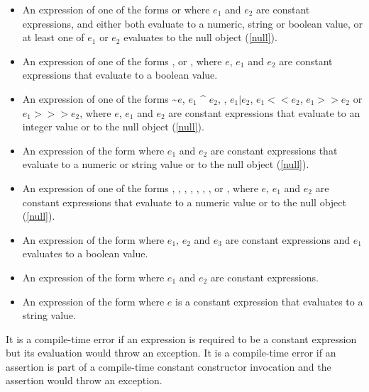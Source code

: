 \documentclass{article}
\begin{document}
\begin{itemize}
\item An expression of one of the forms  or  where $e_1$ and $e_2$ are constant expressions, and either both evaluate to a numeric, string or boolean value, or at least one of $e_1$ or $e_2$ evaluates to the null object (\ref{null}).
\item An expression of one of the forms ,  or , where $e$, $e_1$ and $e_2$ are constant expressions that evaluate to a boolean value.
\item An expression of one of the forms \~{}$e$, $e_1$ \^{} $e_2$, , $e_1 | e_2$, $e_1 << e_2$, $e_1 >> e_2$ or $e_1 >>> e_2$, where $e$, $e_1$ and $e_2$ are constant expressions that evaluate to an integer value or to the null object (\ref{null}).
\item An expression of the form  where $e_1$ and $e_2$ are constant expressions that evaluate to a numeric or string value or to the null object (\ref{null}).
\item An expression of one of the forms , , ,  , , , ,  or , where $e$, $e_1$ and $e_2$ are constant expressions that evaluate to a numeric value or to the null object (\ref{null}).
\item An expression of the form  where $e_1$, $e_2$ and $e_3$ are constant expressions and $e_1$ evaluates to a boolean value.
\item An expression of the form  where $e_1$ and $e_2$ are constant expressions.
\item An expression of the form  where $e$ is a constant expression that evaluates to a string value.
\end{itemize}



\LMHash{}
It is a compile-time error if an expression is required to be a constant expression but its evaluation would throw an exception.
It is a compile-time error if an assertion is part of a compile-time constant constructor invocation and the assertion would throw an exception.
\end{document}
